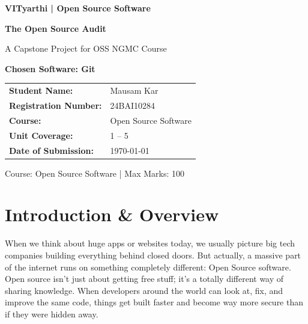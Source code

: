 \documentclass[12pt,a4paper]{report}
\begin{document}
\begin{titlepage}
    \centering
    \vspace*{2cm}
    
    {\LARGE\bfseries VITyarthi | Open Source Software\par}
    \vspace{1.5cm}
    
    {\Huge\bfseries The Open Source Audit\par}
    \vspace{0.5cm}
    {\Large A Capstone Project for OSS NGMC Course\par}
    \vspace{2cm}
    
    {\Large\textbf{Chosen Software: Git}\par}
    \vspace{3cm}
    
    \begin{tabular}{ll}
        \textbf{Student Name:} & Mausam Kar \\
        \textbf{Registration Number:} & 24BAI10284 \\
        \textbf{Course:} & Open Source Software \\
        \textbf{Unit Coverage:} & 1 -- 5 \\
        \textbf{Date of Submission:} & \today \\
    \end{tabular}
    
    \vfill
    
    {\large Course: Open Source Software | Max Marks: 100\par}
\end{titlepage}

\tableofcontents
\newpage


\chapter{Introduction \& Overview}

When we think about huge apps or websites today, we usually picture big tech companies building everything behind closed doors. But actually, a massive part of the internet runs on something completely different: Open Source software. Open source isn't just about getting free stuff; it's a totally different way of sharing knowledge. When developers around the world can look at, fix, and improve the same code, things get built faster and become way more secure than if they were hidden away.
\end{document}
